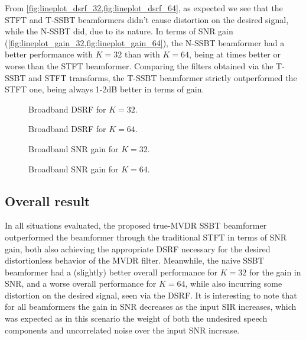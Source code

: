 From \cref{fig:lineplot_dsrf_32,fig:lineplot_dsrf_64}, as expected we see that the STFT and T-SSBT beamformers didn't cause distortion on the desired signal, while the N-SSBT did, due to its nature. In terms of SNR gain (\cref{fig:lineplot_gain_32,fig:lineplot_gain_64}), the N-SSBT beamformer had a better performance with $K = 32$ than with $K = 64$, being at times better or worse than the STFT beamformer. Comparing the filters obtained via the T-SSBT and STFT transforms, the T-SSBT beamformer strictly outperformed the STFT one, being always 1-2dB better in terms of gain.

\begin{figure}[H]
	\centering
	
	\caption{Broadband DSRF for $K = 32$.}
	\label{fig:lineplot_dsrf_32}
\end{figure}

\begin{figure}[H]
	\centering
	
	\caption{Broadband DSRF for $K = 64$.}
	\label{fig:lineplot_dsrf_64}
\end{figure}

\begin{figure}[H]
	\centering
	
	\caption{Broadband SNR gain for $K = 32$.}
	\label{fig:lineplot_gain_32}
\end{figure}

\begin{figure}[H]
\centering

\caption{Broadband SNR gain for $K = 64$.}
\label{fig:lineplot_gain_64}
\end{figure}

\subsection{Overall result}

In all situations evaluated, the proposed true-MVDR SSBT beamformer outperformed the beamformer through the traditional STFT in terms of SNR gain, both also achieving the appropriate DSRF necessary for the desired distortionless behavior of the MVDR filter. Meanwhile, the naive SSBT beamformer had a (slightly) better overall performance for $K = 32$ for the gain in SNR, and a worse overall performance for $K = 64$, while also incurring some distortion on the desired signal, seen via the DSRF. It is interesting to note that for all beamformers the gain in SNR decreases as the input SIR increases, which was expected as in this scenario the weight of both the undesired speech components and uncorrelated noise over the input SNR increase.